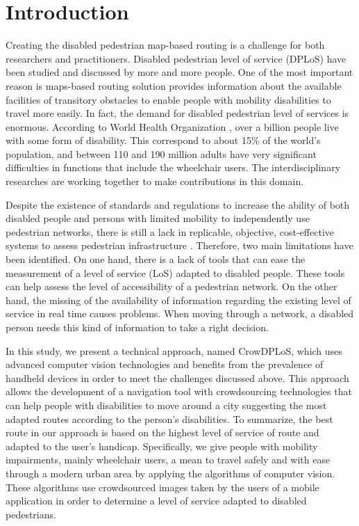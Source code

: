 \documentclass[10pt,conference,a4paper]{IEEEtran}
\begin{document}
\section{Introduction}

Creating the disabled pedestrian map-based routing is a challenge for both researchers and practitioners. Disabled pedestrian level of service (DPLoS) have been studied and discussed by more and more people. One of the most important reason is maps-based routing solution provides information about the available facilities of transitory obstacles to enable people with mobility disabilities to travel more easily. In fact, the demand for disabled pedestrian level of services is enormous. According to World Health Organization \cite{who2017}, over a billion people live with some form of disability. This correspond to about 15\% of the world’s population, and between 110 and 190 million adults have very significant difficulties in functions that include the wheelchair users. The interdisciplinary researches are working together to make contributions in this domain.

Despite the existence of standards and regulations to increase the ability of both disabled people and persons with limited mobility to independently use pedestrian networks, there is still a lack in replicable, objective, cost-effective systems to assess pedestrian infrastructure \cite{frackelton2013measuring}. Therefore, two main limitations have been identified. On one hand, there is a lack of tools that can ease the measurement of a level of service (LoS) adapted to disabled people. These tools can help assess the level of accessibility of a pedestrian network. On the other hand, the missing of the availability of information regarding the existing level of service in real time causes problems. When moving through a network, a disabled person needs this kind of information to take a right decision.

In this study, we present a technical approach, named CrowDPLoS, which uses advanced computer vision technologies and benefits from the prevalence of handheld devices in order to meet the challenges discussed above. This approach allows the development of a navigation tool with crowdsourcing technologies that can help people with disabilities to move around a city suggesting the most adapted routes according to the person’s disabilities. To summarize, the best route in our approach is based on the highest level of service of route and adapted to the user’s handicap. Specifically, we give people with mobility impairments, mainly wheelchair users, a mean to travel safely and with ease through a modern urban area by applying the algorithms of computer vision. These algorithms use crowdsourced images taken by the users of a mobile application in order to determine a level of service adapted to disabled pedestrians.
\end{document}
